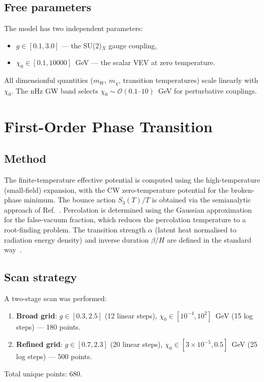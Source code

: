 \documentclass[12pt,a4paper]{article}
\begin{document}
\subsection{Free parameters}

The model has two independent parameters:
\begin{itemize}
\item $g \in [0.1, 3.0]$ --- the SU(2)$_X$ gauge coupling,
\item $\chi_0 \in [0.1, 10000]$~GeV --- the scalar VEV at zero temperature.
\end{itemize}

All dimensionful quantities ($m_W$, $m_\chi$, transition temperatures) scale linearly with $\chi_0$. The nHz GW band selects $\chi_0 \sim \mathcal{O}(0.1\text{--}10)$~GeV for perturbative couplings.

\section{First-Order Phase Transition}
\label{sec:fopt}

\subsection{Method}

The finite-temperature effective potential is computed using the high-temperature (small-field) expansion, with the CW zero-temperature potential for the broken-phase minimum. The bounce action $S_3(T)/T$ is obtained via the semianalytic approach of Ref.~\cite{Pascoli:2026}. Percolation is determined using the Gaussian approximation for the false-vacuum fraction, which reduces the percolation temperature to a root-finding problem. The transition strength $\alpha$ (latent heat normalised to radiation energy density) and inverse duration $\beta/H$ are defined in the standard way~\cite{Pascoli:2026}.

\subsection{Scan strategy}

A two-stage scan was performed:
\begin{enumerate}
\item \textbf{Broad grid}: $g \in [0.3, 2.5]$ (12 linear steps), $\chi_0 \in [10^{-4}, 10^{2}]$~GeV (15 log steps) --- 180 points.
\item \textbf{Refined grid}: $g \in [0.7, 2.3]$ (20 linear steps), $\chi_0 \in [3\times10^{-5}, 0.5]$~GeV (25 log steps) --- 500 points.
\end{enumerate}
Total unique points: 680.
\end{document}
